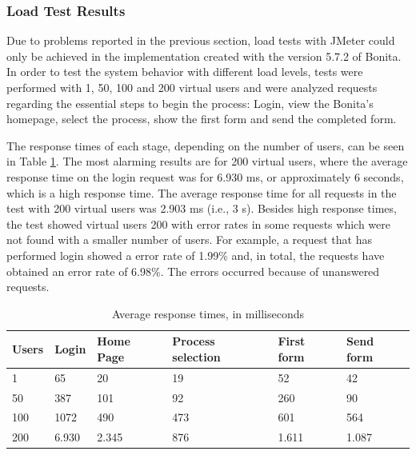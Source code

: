 \documentclass[runningheads,a4paper]{llncs}
\begin{document}
\subsubsection{Load Test Results}

Due to problems reported in the previous section, load tests with JMeter could only be achieved in the implementation created with the version 5.7.2 of Bonita. In order to test the system behavior with different load levels, tests were performed with 1, 50, 100 and 200 virtual users and were analyzed requests regarding the essential steps to begin the process: Login, view the Bonita's homepage, select the process, show the first form and send the completed form. %

The response times of each stage, depending on the number of users, can be seen in Table \ref{tab:resultadoCarga}. The most alarming results are for 200 virtual users, where the average response time on the login request was for 6.930 ms, or approximately 6 seconds, which is a high response time. The average response time for all requests in the test with 200 virtual users was 2.903 ms (i.e., 3 s). Besides high response times, the test showed virtual users 200 with error rates in some requests which were not found with a smaller number of users. For example, a request that has performed login showed a error rate of 1.99\% and, in total, the requests have obtained an error rate of 6.98\%. The errors occurred because of unanswered requests.


\begin{table}
{\scriptsize
\centering
\begin{tabular}{p{2cm}|p{2cm}|p{2cm}|p{2cm}|p{2cm}|p{2cm}}
\hline
Users & Login & Home Page & Process selection & First form & Send form\\\hline
1 & 65 & 20 & 19 & 52 & 42\\\hline
50 & 387 & 101 & 92 & 260 & 90\\\hline
100 & 1072 & 490 & 473 & 601 & 564\\\hline
200 & 6.930 & 2.345 & 876 & 1.611 & 1.087\\\hline
\end{tabular}
}
\caption{Average response times, in milliseconds}
\label{tab:resultadoCarga}
\end{table}
\end{document}
